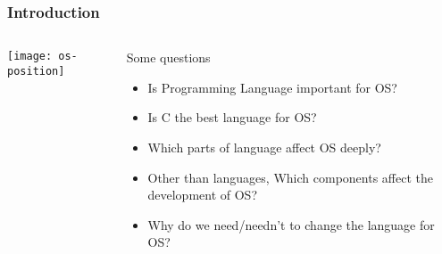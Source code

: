 %
%
\begin{frame}[plain]
	\frametitle{Introduction}
	
	
	
	\begin{columns}
		
		\begin{column}{.3\textwidth}
			
			\texttt{[image: os-position]}
			
		\end{column}
		
		\begin{column}{.7\textwidth}
			
			\Large
			Some questions
			\begin{itemize}
				\item  Is Programming Language important for OS?
				\item Is C  the best language for OS?
				\item Which parts of language affect OS deeply?
				\item Other than languages, Which components affect the development of OS? 
				\item Why do we need/needn't to change the language for OS?				
			\end{itemize}
			
		\end{column}
		
		
	\end{columns}
	
	
\end{frame}

